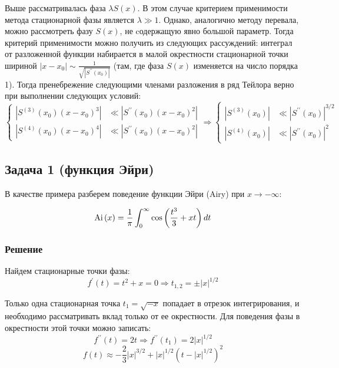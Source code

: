 \documentclass[a4paper,12pt]{article}
\begin{document}
Выше рассматривалась фаза $\lambda S(x)$. В этом случае критерием применимости метода стационарной фазы является $\lambda\gg 1$. Однако, аналогично методу перевала, можно рассмотреть фазу $S(x)$, не cодержащую явно большой параметр. Тогда критерий применимости можно получить из следующих рассуждений: интеграл
от разложенной функции набирается в малой окрестности стационарной
точки шириной $|x-x_{0}|\sim\frac{1}{\sqrt{|S^{\prime\prime}(x_{0})|}}$
(там, где фаза $S(x)$ изменяется на число порядка 1). Тогда пренебрежение
следующими членами разложения в ряд Тейлора верно при выполнении следующих
условий: 
\[
\begin{cases}
|S^{(3)}(x_{0})(x-x_{0})^{3}| & \ll|S^{\prime\prime}(x_{0})(x-x_{0})^{2}|\\
|S^{(4)}(x_{0})(x-x_{0})^{4}| & \ll|S^{\prime\prime}(x_{0})(x-x_{0})^{2}|
\end{cases}\Rightarrow\begin{cases}
|S^{(3)}(x_{0})| & \ll|S^{\prime\prime}(x_{0})|^{3/2}\\
|S^{(4)}(x_{0})| & \ll|S^{\prime\prime}(x_{0})|^{2}
\end{cases}
\]



\subsection*{Задача 1 (функция Эйри)}

В качестве примера разберем поведение функции Эйри (Airy) при $x\to-\infty$:

\[
{\rm Ai}\left(x\right)=\frac{1}{\pi}\int_{0}^{\infty}\cos\left(\frac{t^{3}}{3}+xt\right)dt
\]



\subsubsection*{Решение}

Найдем стационарные точки фазы:
\[
f^{\prime}(t)=t^{2}+x=0\Rightarrow t_{1,2}=\pm|x|^{1/2}
\]

\noindent
Только одна стационарная точка $t_{1}=\sqrt{-x}$ попадает в отрезок
интегрирования, и необходимо рассматривать вклад только от ее окрестности.
Для поведения фазы в окрестности этой точки можно записать:
\[
f^{\prime\prime}(t)=2t\Rightarrow f^{\prime\prime}(t_{1})=2|x|^{1/2}
\]
\[
f(t)\approx-\frac{2}{3}|x|^{3/2}+|x|^{1/2}(t-|x|^{1/2})^{2}
\]
\end{document}
